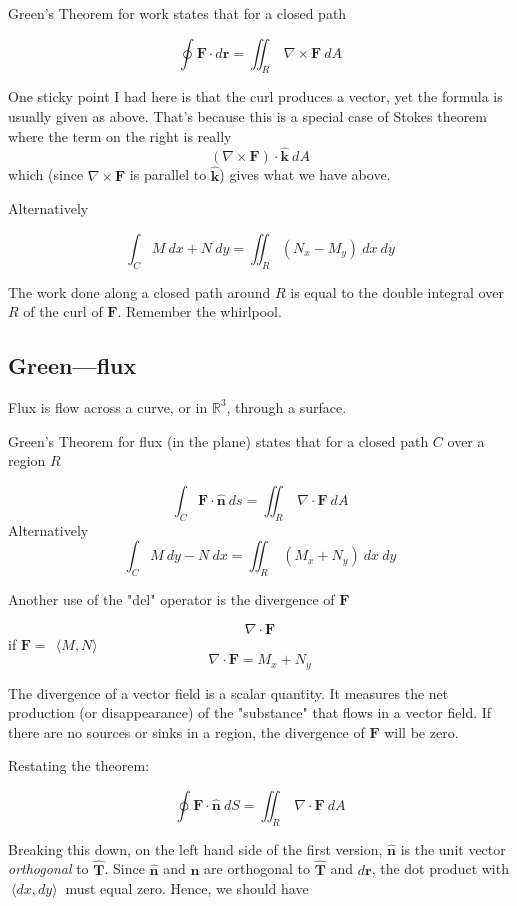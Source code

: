 \documentclass[11pt, oneside]{article}
\begin{document}
Green's Theorem for work states that for a closed path

\[ \oint \mathbf{F} \cdot d\mathbf{r}  = \iint_R \ \nabla \times \mathbf{F} \ dA \]

One sticky point I had here is that the curl produces a vector, yet the formula is usually given as above.  That's because this is a special case of Stokes theorem where the term on the right is really 
\[ (\nabla \times \mathbf{F}) \cdot \hat{\mathbf{k}} \ dA \]
which (since $\nabla \times \mathbf{F} $ is parallel to $\hat{\mathbf{k}}$) gives what we have above.

Alternatively 

\[ \int_C M \ dx + N \ dy = \iint_R (N_x - M_y) \ dx \ dy \]

The work done along a closed path around $R$ is equal to the double integral over $R$ of the curl of $\mathbf{F}$.  Remember the whirlpool.

\subsection*{Green---flux}
Flux is flow across a curve, or in $\mathbb{R}^3$, through a surface.

Green's Theorem for flux (in the plane) states that for a closed path $C$ over a region $R$

\[ \int_C \mathbf{F} \cdot \hat{\mathbf{n}} \  ds = \iint_R \ \nabla \cdot \mathbf{F} \ dA \]
Alternatively
\[ \int_C M \ dy - N \ dx =  \iint_R \ (M_x + N_y) \ dx \ dy \]

Another use of the "del" operator is the divergence of $\mathbf{F}$

\[ \nabla \cdot \mathbf{F} \]
if $\mathbf{F} = \ \ \langle M,N \rangle \ $
\[ \nabla \cdot \mathbf{F} = M_x + N_y \]

The divergence of a vector field is a scalar quantity.  It measures the net production (or disappearance) of the "substance" that flows in a vector field.  If there are no sources or sinks in a region, the divergence of $\mathbf{F}$ will be zero.

Restating the theorem:

\[ \oint \mathbf{F} \cdot \hat{\mathbf{n}} \ dS  = \iint_R \ \nabla \cdot \mathbf{F} \ dA \]

Breaking this down, on the left hand side of the first version, $\hat{\mathbf{n}}$ is the unit vector \emph{orthogonal} to $\hat{\mathbf{T}}$.  Since $\hat{\mathbf{n}}$ and $\mathbf{n}$ are orthogonal to $\hat{\mathbf{T}}$ and $d\mathbf{r}$, the dot product with $\ \langle dx,dy \rangle \ $ must equal zero.  Hence, we should have
\end{document}

